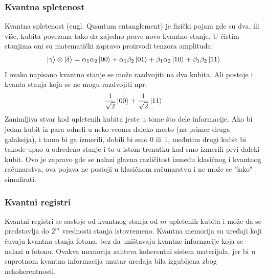 \documentclass[12pt, letterpaper, oneside]{article}
\begin{document}
\subsubsection*{Kvantna spletenost}
Kvantna spletenost (engl. Quantum entanglement) je fizički pojam gde su dva, ili više, kubita povezana tako da zajedno prave novo kvantno stanje.
U čistim stanjima oni su matematički zapravo proizvodi tenzora amplituda:
\[
    \ket{\gamma} \otimes \ket{\delta} = \alpha_1\alpha_2\ket{00} + \alpha_1\beta_2\ket{01} + \beta_1\alpha_2\ket{10} + \beta_1\beta_2\ket{11}
\]
I ovako napisano kvantno stanje se može razdvojiti na dva kubita. Ali postoje i kvanta stanja koja se ne mogu razdvojiti npr.
\[
 \frac{1}{\sqrt{2}}\ket{00} + \frac{1}{\sqrt{2}}\ket{11}
\]
Zanimljiva stvar kod upletenih kubita jeste u tome što dele informacije. Ako bi jedan kubit iz para odneli u neko veoma daleko mesto (na primer druga galaksija),
i tamo bi ga izmerili, dobili bi smo 0 ili 1, međutim drugi kubit bi takođe upao u određeno stanje i to u istom trenutku kad smo izmerili prvi daleki kubit.
Ovo je zapravo gde se nalazi glavna različitost između klasičnog i kvantnog računarstva, ova pojava ne postoji u klasičnom računarstvu i ne može se "lako" simulirati.
\subsubsection*{Kvantni registri}
Kvantni registri se sastoje od kvantnog stanja od $m$ upletenih kubita i može da se predstavlja do $2^m$ vrednosti stanja istovremeno.
Kvantna memorija su uređaji koji čuvaju kvantna stanja fotona, bez da uništavaju kvantne informacije koja se nalazi u fotonu.
Ovakva memorija zahteva koherentni sistem materijala, jer bi u suprotnom kvantna informacija unutar uređaja bila izgubljena zbog nekoherentnosti.
\end{document}
